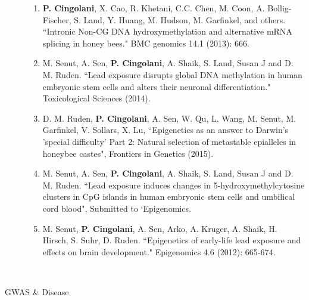 \begin{description}
		\begin{enumerate}[resume]
			\item \textbf{P. Cingolani}, X. Cao, R. Khetani, C.C. Chen, M. Coon, A. Bollig-Fischer, S. Land, Y. Huang, M. Hudson, M. Garfinkel, and others. ``Intronic Non-CG DNA hydroxymethylation and alternative mRNA splicing in honey bees." BMC genomics 14.1 (2013): 666.
			\item M. Senut, A. Sen, \textbf{P. Cingolani}, A. Shaik, S. Land, Susan J and D. M. Ruden. ``Lead exposure disrupts global DNA methylation in human embryonic stem cells and alters their neuronal differentiation." Toxicological Sciences (2014).
			\item D. M. Ruden, \textbf{P. Cingolani}, A. Sen, W. Qu, L. Wang, M. Senut, M. Garfinkel, V. Sollars, X. Lu, ``Epigenetics as an answer to Darwin's 'special difficulty' Part 2: Natural selection of metastable epialleles in honeybee castes", Frontiers in Genetics (2015).
			\item M. Senut, A. Sen, \textbf{P. Cingolani}, A. Shaik, S. Land, Susan J and D. M. Ruden. ``Lead exposure induces changes in 5-hydroxymethylcytosine clusters in CpG islands in human embryonic stem cells and umbilical cord blood", Submitted to `Epigenomics.
			\item M. Senut, \textbf{P. Cingolani}, A. Sen, Arko, A. Kruger, A. Shaik, H. Hirsch, S. Suhr, D. Ruden. ``Epigenetics of early-life lead exposure and effects on brain development." Epigenomics 4.6 (2012): 665-674.
		\end{enumerate}
		~ \\
	
	\item[GWAS \& Disease] ~
	

\end{description}
